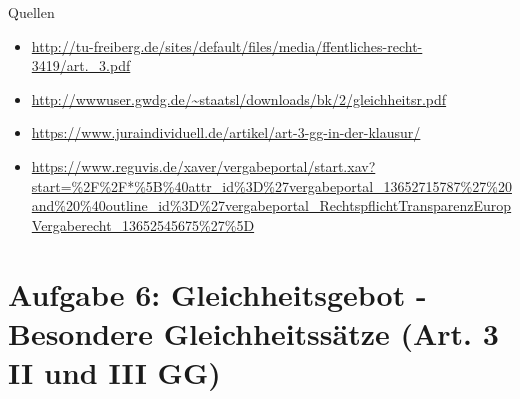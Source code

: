 \documentclass{article}
\begin{document}
	Quellen
	\begin{itemize}
		\item \url{http://tu-freiberg.de/sites/default/files/media/ffentliches-recht-3419/art._3.pdf}
		\item \url{http://wwwuser.gwdg.de/~staatsl/downloads/bk/2/gleichheitsr.pdf}
		\item \url{https://www.juraindividuell.de/artikel/art-3-gg-in-der-klausur/}
		\item \url{https://www.reguvis.de/xaver/vergabeportal/start.xav?start=%2F%2F*%5B%40attr_id%3D%27vergabeportal_13652715787%27%20and%20%40outline_id%3D%27vergabeportal_RechtspflichtTransparenzEuropVergaberecht_13652545675%27%5D}
	\end{itemize}
	
	\section*{Aufgabe 6: Gleichheitsgebot - Besondere Gleichheitssätze (Art. 3 II und III GG)}
\end{document}
